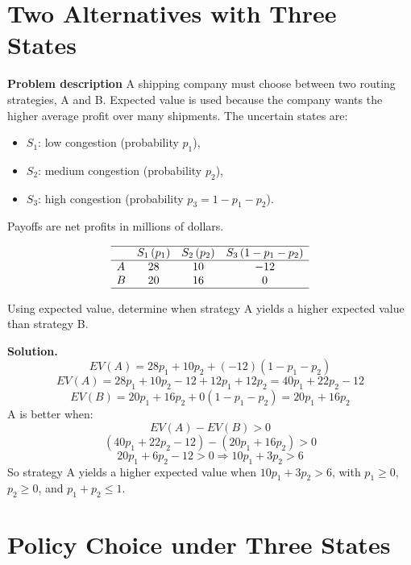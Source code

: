 \begin{ExamProblems}
		
		\hypertarget{c7-cu-ex5}{}
		\item
		\section{Two Alternatives with Three States}
		
		\textbf{Problem description}
		A shipping company must choose between two routing strategies, A and B. Expected value is used because the company wants the higher average profit over many shipments. The uncertain states are:
		\begin{itemize}
			\item \(S_1\): low congestion (probability \(p_1\)),
			\item \(S_2\): medium congestion (probability \(p_2\)),
			\item \(S_3\): high congestion (probability \(p_3=1-p_1-p_2\)).
		\end{itemize}
		Payoffs are net profits in millions of dollars.
		
		\[
		\begin{array}{lccc}
			\hline
			& S_1\,(p_1) & S_2\,(p_2) & S_3\,(1-p_1-p_2) \\
			\hline
			A & 28 & 10 & -12 \\
			B & 20 & 16 & 0 \\
			\hline
		\end{array}
		\]
		
		Using expected value, determine when strategy A yields a higher expected value than strategy B.
		
		\textbf{Solution.}
		\[
		EV(A)=28p_1+10p_2+(-12)(1-p_1-p_2)
		\]
		\[
		EV(A)=28p_1+10p_2-12+12p_1+12p_2=40p_1+22p_2-12
		\]
		\[
		EV(B)=20p_1+16p_2+0(1-p_1-p_2)=20p_1+16p_2
		\]
		A is better when:
		\[
		EV(A)-EV(B)>0
		\]
		\[
		(40p_1+22p_2-12)-(20p_1+16p_2)>0
		\]
		\[
		20p_1+6p_2-12>0\Rightarrow 10p_1+3p_2>6
		\]
		So strategy A yields a higher expected value when \(10p_1+3p_2>6\), with \(p_1\ge0\), \(p_2\ge0\), and \(p_1+p_2\le1\).
		
		
		\hypertarget{c7-cu-ex6}{}
		\item
		\section{Policy Choice under Three States}
		

\end{ExamProblems}
